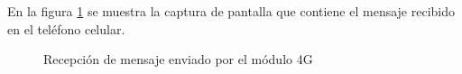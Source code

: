 En la figura \ref{fig:RecepcionMsj} se muestra la captura de pantalla que contiene el mensaje recibido en el teléfono celular.

	\begin{figure}[htbp!]
		\centering
		\caption{Recepción de mensaje enviado por el módulo 4G}
		\label{fig:RecepcionMsj}
	\end{figure}
	
	\clearpage
